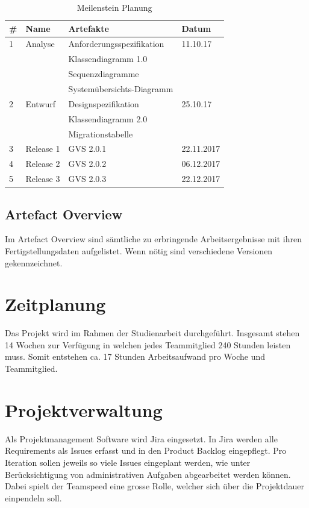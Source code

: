\documentclass[11pt,a4paper,english,oneside]{book}
\numberwithin{equation}{chapter}
\begin{document}
	\begin{table}[h!]
		\centering
		\begin{tabular}{l l l l}
			\toprule 
			\# & Name & Artefakte & Datum \\
			\toprule 
			1 & Analyse & Anforderungsspezifikation & 11.10.17 \\
			& & Klassendiagramm 1.0 & \\
			& & Sequenzdiagramme & \\
			& &  Systemübersichts-Diagramm & \\
			\midrule
			2 & Entwurf  & Designspezifikation & 25.10.17\\
			& & Klassendiagramm 2.0 & \\
			& & Migrationstabelle & \\
			\midrule
			3 & Release 1 & GVS 2.0.1 & 22.11.2017 \\
			\midrule
			4 & Release 2 & GVS 2.0.2 & 06.12.2017 \\
			\midrule
			5 & Release 3 & GVS 2.0.3 & 22.12.2017 \\
			\bottomrule 
		\end{tabular} 
		\caption{Meilenstein Planung} 
	\end{table}
	
	\subsection{Artefact Overview}
	Im Artefact Overview sind sämtliche zu erbringende Arbeitsergebnisse mit ihren Fertigstellungsdaten aufgelistet. Wenn nötig sind verschiedene Versionen gekennzeichnet.
	
	
	
	
	\section{Zeitplanung}
	
	Das Projekt wird im Rahmen der Studienarbeit durchgeführt. Insgesamt stehen 14 Wochen zur Verfügung in welchen jedes Teammitglied 240 Stunden leisten muss. Somit entstehen ca. 17 Stunden Arbeitsaufwand pro Woche und Teammitglied.
	
	
	
	\section{Projektverwaltung}
	
	Als Projektmanagement Software wird Jira \cite{jira} eingesetzt. In Jira werden alle Requirements als Issues erfasst und in den Product Backlog eingepflegt. Pro Iteration sollen jeweils so viele Issues eingeplant werden, wie unter Berücksichtigung von administrativen Aufgaben abgearbeitet werden können. Dabei spielt der Teamspeed eine grosse Rolle, welcher sich über die Projektdauer einpendeln soll. 
	
\end{document}
